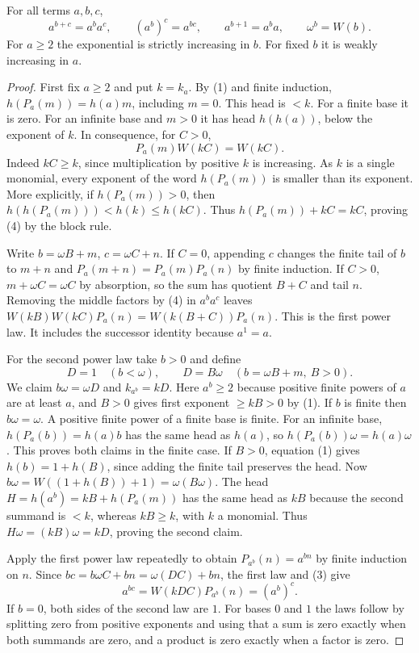 \begin{theorem}\label{th:ordinary-pow}
For all terms $a,b,c$,
\[
 a^{b+c}=a^b a^c,\qquad (a^b)^c=a^{bc},\qquad
 a^{b+1}=a^b a,\qquad \omega^b=W(b).
\]
For $a\ge2$ the exponential is strictly increasing in $b$. For fixed
$b$ it is weakly increasing in $a$.
\end{theorem}
\begin{proof}
First fix $a\ge2$ and put $k=k_a$. By (1) and finite induction,
$h(P_a(m))=h(a)m$, including $m=0$. This head is $<k$. For a finite
base it is zero. For an infinite base and $m>0$ it has head $h(h(a))$, below
the exponent of $k$. In consequence, for $C>0$,
\[
             P_a(m)W(kC)=W(kC).                                \tag{4}
\]
Indeed $kC\ge k$, since multiplication by positive $k$ is increasing.
As $k$ is a single monomial, every exponent of the word $h(P_a(m))$
is smaller than its exponent. More explicitly, if $h(P_a(m))>0$, then
$h(h(P_a(m)))<h(k)\le h(kC)$.
Thus $h(P_a(m))+kC=kC$, proving (4) by the block rule.

Write $b=\omega B+m$, $c=\omega C+n$. If $C=0$, appending $c$ changes
the finite tail of $b$ to $m+n$ and $P_a(m+n)=P_a(m)P_a(n)$ by finite
induction. If $C>0$, $m+\omega C=\omega C$ by absorption, so the sum
has quotient $B+C$ and tail $n$. Removing the middle factors by (4)
in $a^b a^c$ leaves
$W(kB)W(kC)P_a(n)=W(k(B+C))P_a(n)$. This is the first power law.
It includes the successor identity because $a^1=a$.

For the second power law take $b>0$ and define
\[
 D=1\quad(b<\omega),\qquad D=B\omega\quad(b=\omega B+m,\ B>0).
\]
We claim $b\omega=\omega D$ and $k_{a^b}=kD$. Here $a^b\ge2$ because positive
finite powers of $a$ are at least $a$, and $B>0$ gives first exponent
$\ge kB>0$ by (1). If $b$ is finite then $b\omega=\omega$.
A positive finite power of a finite base is finite. For an infinite base,
$h(P_a(b))=h(a)b$ has the same head as $h(a)$, so
$h(P_a(b))\omega=h(a)\omega$. This proves both claims in the finite case.
If $B>0$, equation (1) gives $h(b)=1+h(B)$, since adding the finite
tail preserves the head. Now $b\omega=W((1+h(B))+1)=\omega(B\omega)$.
The head $H=h(a^b)=kB+h(P_a(m))$ has the same head as $kB$ because the second
summand is $<k$, whereas $kB\ge k$, with $k$ a monomial.
Thus $H\omega=(kB)\omega=kD$, proving the second claim.

Apply the first power law repeatedly to obtain
$P_{a^b}(n)=a^{bn}$ by finite induction on $n$.
Since $bc=b\omega C+bn=\omega(DC)+bn$, the first law and (3) give
\[
       a^{bc}=W(kDC)P_{a^b}(n)=(a^b)^c .
\]
If $b=0$, both sides of the second law are $1$. For bases $0$ and $1$
the laws follow by splitting zero from positive exponents and using that
a sum is zero exactly when both summands are zero, and a product is zero
exactly when a factor is zero.


\end{proof}
